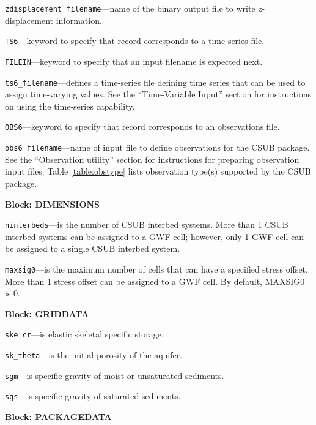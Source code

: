 \begin{description}
\item \texttt{zdisplacement\_filename}---name of the binary output file to write z-displacement information.

\item \texttt{TS6}---keyword to specify that record corresponds to a time-series file.

\item \texttt{FILEIN}---keyword to specify that an input filename is expected next.

\item \texttt{ts6\_filename}---defines a time-series file defining time series that can be used to assign time-varying values. See the ``Time-Variable Input'' section for instructions on using the time-series capability.

\item \texttt{OBS6}---keyword to specify that record corresponds to an observations file.

\item \texttt{obs6\_filename}---name of input file to define observations for the CSUB package. See the ``Observation utility'' section for instructions for preparing observation input files. Table \ref{table:obstype} lists observation type(s) supported by the CSUB package.

\end{description}
\item \textbf{Block: DIMENSIONS}

\begin{description}
\item \texttt{ninterbeds}---is the number of CSUB interbed systems.  More than 1 CSUB interbed systems can be assigned to a GWF cell; however, only 1 GWF cell can be assigned to a single CSUB interbed system.

\item \texttt{maxsig0}---is the maximum number of cells that can have a specified stress offset.  More than 1 stress offset can be assigned to a GWF cell. By default, MAXSIG0 is 0.

\end{description}
\item \textbf{Block: GRIDDATA}

\begin{description}
\item \texttt{ske\_cr}---is elastic skeletal specific storage.

\item \texttt{sk\_theta}---is the initial porosity of the aquifer.

\item \texttt{sgm}---is specific gravity of moist or unsaturated sediments.

\item \texttt{sgs}---is specific gravity of saturated sediments.

\end{description}
\item \textbf{Block: PACKAGEDATA}

